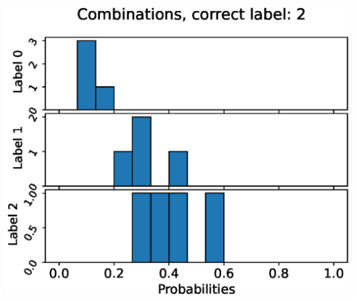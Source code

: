 \begin{center}
\begin{minipage}{0.33\textwidth}
  \includegraphics[width=\textwidth]{files/figs/app/hists/pelvis/c2.eps}
\end{minipage}


\end{center}
